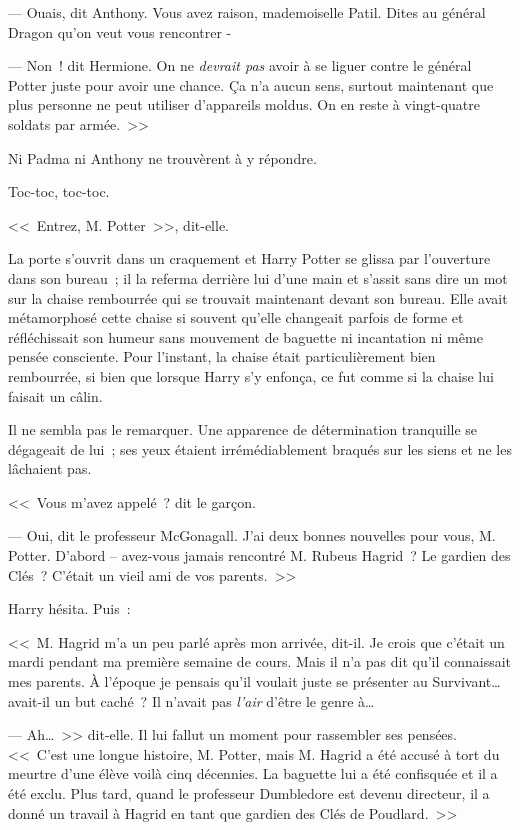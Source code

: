 --- Ouais, dit Anthony. Vous avez raison, mademoiselle Patil. Dites au général Dragon qu'on veut vous rencontrer -

--- Non~! dit Hermione. On ne \emph{devrait pas} avoir à se liguer contre le général Potter juste pour avoir une chance. Ça n'a aucun sens, surtout maintenant que plus personne ne peut utiliser d'appareils moldus. On en reste à vingt-quatre soldats par armée.~>>

Ni Padma ni Anthony ne trouvèrent à y répondre.

\later

Toc-toc, toc-toc.

<<~Entrez, M. Potter~>>, dit-elle.

La porte s'ouvrit dans un craquement et Harry Potter se glissa par l'ouverture dans son bureau~; il la referma derrière lui d'une main et s'assit sans dire un mot sur la chaise rembourrée qui se trouvait maintenant devant son bureau. Elle avait métamorphosé cette chaise si souvent qu'elle changeait parfois de forme et réfléchissait son humeur sans mouvement de baguette ni incantation ni même pensée consciente. Pour l'instant, la chaise était particulièrement bien rembourrée, si bien que lorsque Harry s'y enfonça, ce fut comme si la chaise lui faisait un câlin.

Il ne sembla pas le remarquer. Une apparence de détermination tranquille se dégageait de lui~; ses yeux étaient irrémédiablement braqués sur les siens et ne les lâchaient pas.

<<~Vous m'avez appelé~? dit le garçon.

--- Oui, dit le professeur McGonagall. J'ai deux bonnes nouvelles pour vous, M. Potter. D'abord -- avez-vous jamais rencontré M. Rubeus Hagrid~? Le gardien des Clés~? C'était un vieil ami de vos parents.~>>

Harry hésita. Puis~:

<<~M. Hagrid m'a un peu parlé après mon arrivée, dit-il. Je crois que c'était un mardi pendant ma première semaine de cours. Mais il n'a pas dit qu'il connaissait mes parents. À l'époque je pensais qu'il voulait juste se présenter au Survivant… avait-il un but caché~? Il n'avait pas \emph{l'air} d'être le genre à…

--- Ah…~>> dit-elle. Il lui fallut un moment pour rassembler ses pensées. <<~C'est une longue histoire, M. Potter, mais M. Hagrid a été accusé à tort du meurtre d'une élève voilà cinq décennies. La baguette lui a été confisquée et il a été exclu. Plus tard, quand le professeur Dumbledore est devenu directeur, il a donné un travail à Hagrid en tant que gardien des Clés de Poudlard.~>>


